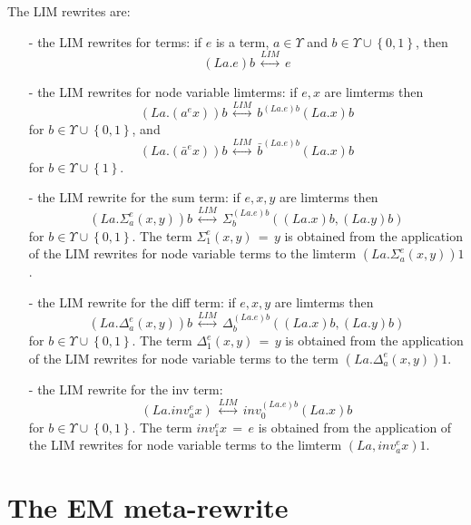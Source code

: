 \documentclass{article}
\begin{document}
\begin{definition}
The LIM rewrites are: 
\begin{enumerate}
\item[-] the LIM rewrites for  terms: if $e$ is a term, $a \in \Upsilon$ and $\displaystyle b \in \Upsilon \cup \left\{ 0 , 1 \right\}$, then $$(La.e)b \, \stackrel{LIM}{\longleftrightarrow} \, e$$  
\item[-] the LIM rewrites for node variable limterms: if $e, x$ are limterms then 
$$\displaystyle \left(La.\left(a^{e} x\right)\right) b  \, \stackrel{LIM}{\longleftrightarrow} \, b^{(La.e)b} (La.x)b$$ for $\displaystyle b \in \Upsilon \cup \left\{ 0 , 1 \right\}$, and  
$$\displaystyle \left(La.\left(\bar{a}^{e} x\right)\right) b  \, \stackrel{LIM}{\longleftrightarrow} \, \bar{b}^{(La.e)b} (La.x)b$$ for $\displaystyle b \in \Upsilon \cup \left\{  1 \right\}$. 
\item[-] the LIM rewrite for the sum term: if $e, x, y$ are limterms then 
$$\displaystyle \left( La.\Sigma_{a}^{e}(x,y) \right) b \, \stackrel{LIM}{\longleftrightarrow} \, \Sigma_{b}^{(La.e)b}((La.x)b,(La.y)b)$$ for $\displaystyle b \in \Upsilon \cup \left\{ 0 , 1 \right\}$. 
The term $\displaystyle \Sigma_{1}^{e} (x,y) \, = \, y$ is obtained from the application of the LIM rewrites for node variable terms to the limterm $\displaystyle (La.\Sigma_{a}^{e}(x,y)) 1$. 
\item[-] the LIM rewrite for the diff term: if $e, x, y$ are limterms then $$\displaystyle \left( La.\Delta_{a}^{e}(x,y)\right)b \, \stackrel{LIM}{\longleftrightarrow} \, \Delta_{b}^{(La.e)b}((La.x)b,(La.y)b)$$ for $\displaystyle b \in \Upsilon \cup \left\{ 0 , 1 \right\}$. 
The term $\displaystyle \Delta_{1}^{e} (x,y) \, = \, y$ is obtained from the application of the LIM rewrites for node variable terms to the term $\displaystyle (La.\Delta_{a}^{e}(x,y)) 1$. 
\item[-] the LIM rewrite for the inv term: $$\displaystyle \left(La.inv_{a}^{e} x\right) \, \stackrel{LIM}{\longleftrightarrow} \, inv_{0}^{(La.e)b} (La.x)b$$ for $\displaystyle b \in \Upsilon \cup \left\{ 0 , 1 \right\}$. The term $\displaystyle inv_{1}^{e} x  \, = \, e$ is obtained from the application of the LIM rewrites for node variable terms to the limterm $\displaystyle (La,inv_{a}^{e} x) 1$. 
\end{enumerate}

\end{definition}

\section{The EM meta-rewrite}
\end{document}
